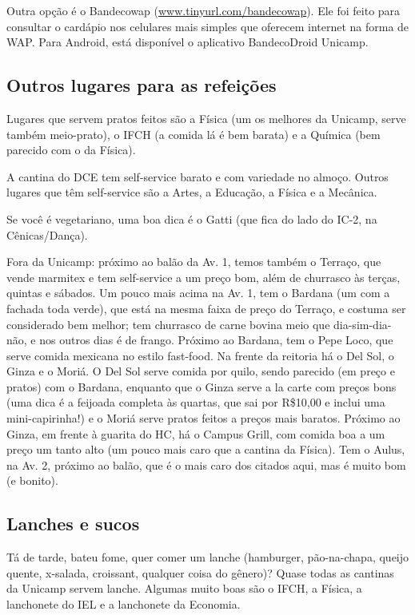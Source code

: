 Outra opção é o Bandecowap (\url{www.tinyurl.com/bandecowap}). Ele foi feito
para consultar o cardápio nos celulares mais simples que oferecem internet na forma
de WAP. Para Android, está disponível o aplicativo BandecoDroid Unicamp.

\subsection{Outros lugares para as refeições}

Lugares que servem pratos feitos são a Física (um os melhores da Unicamp, serve
também meio-prato), o IFCH (a comida lá é bem barata) e a Química (bem parecido
com o da Física).

A cantina do DCE tem self-service barato e com variedade no almoço. Outros
lugares que têm self-service são a Artes, a Educação, a Física e a Mecânica.

Se você é vegetariano, uma boa dica é o Gatti (que fica do lado do IC-2, na
Cênicas/Dança).

Fora da Unicamp: próximo ao balão da Av. 1, temos também o Terraço, que vende
marmitex e tem self-service a um preço bom, além de churrasco às terças, quintas
e sábados. Um pouco mais acima na Av. 1, tem o Bardana (um com a fachada toda
verde), que está na mesma faixa de preço do Terraço, e costuma ser considerado
bem melhor; tem churrasco de carne bovina meio que dia-sim-dia-não, e nos outros
dias é de frango. Próximo ao Bardana, tem o Pepe Loco, que serve comida mexicana
no estilo fast-food. Na frente da reitoria há o Del Sol, o Ginza e o Moriá.
O Del Sol serve comida por quilo, sendo parecido (em preço e pratos) com
o Bardana, enquanto que o Ginza serve a la carte com preços bons (uma dica
é a feijoada completa às quartas, que sai por R\$10,00 e inclui uma
mini-capirinha!) e o Moriá serve pratos feitos a preços mais baratos. Próximo ao
Ginza, em frente à guarita do HC, há o Campus Grill, com comida boa a um preço
um tanto alto (um pouco mais caro que a cantina da Física). Tem o Aulus, na Av.
2, próximo ao balão, que é o mais caro dos citados aqui, mas é muito bom (e
bonito).

\subsection{Lanches e sucos}

Tá de tarde, bateu fome, quer comer um lanche (hamburger, pão-na-chapa, queijo
quente, x-salada, croissant, qualquer coisa do gênero)? Quase todas as cantinas
da Unicamp servem lanche. Algumas muito boas são o IFCH, a Física, a lanchonete
do IEL e a lanchonete da Economia.

